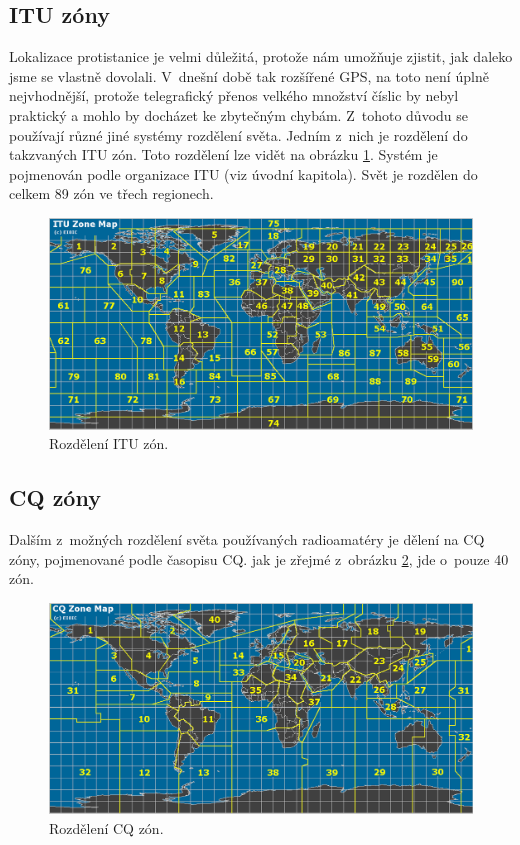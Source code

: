 \subsection{ITU zóny}

Lokalizace protistanice je velmi důležitá, protože nám umožňuje zjistit, jak
daleko jsme se vlastně dovolali. V~dnešní době tak rozšířené GPS, na toto není
úplně nejvhodnější, protože telegrafický přenos velkého množství číslic
by nebyl praktický a mohlo by docházet ke zbytečným chybám. Z~tohoto důvodu se
používají různé jiné systémy rozdělení světa. Jedním z~nich je rozdělení do takzvaných ITU zón.
Toto rozdělení lze vidět na obrázku \ref{fig:itu_zony}.
Systém je pojmenován podle organizace ITU (viz úvodní kapitola). Svět je rozdělen do celkem 
89 zón ve třech regionech.

\begin{figure}[h]
\centering
\includegraphics[trim=0cm 0cm 0cm 0cm, scale=0.4]{fig/itu-zone}
\caption{Rozdělení ITU zón.}
\label{fig:itu_zony}
\end{figure}

\subsection{CQ zóny}

Dalším z~možných rozdělení světa používaných radioamatéry je dělení na CQ zóny, pojmenované podle časopisu CQ.
jak je zřejmé z~obrázku \ref{fig:cq_zony}, jde o~pouze 40 zón.

\begin{figure}[h]
\centering
\includegraphics[trim=0cm 0cm 0cm 0cm, scale=0.4]{fig/cq-zone}
\caption{Rozdělení CQ zón.}
\label{fig:cq_zony}
\end{figure}

